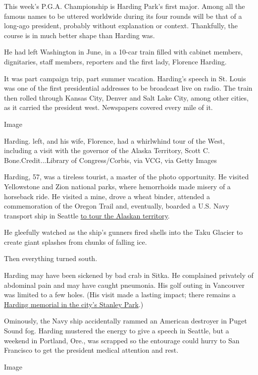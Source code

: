 This week's P.G.A. Championship is Harding Park's first major. Among all
the famous names to be uttered worldwide during its four rounds will be
that of a long-ago president, probably without explanation or context.
Thankfully, the course is in much better shape than Harding was.

He had left Washington in June, in a 10-car train filled with cabinet
members, dignitaries, staff members, reporters and the first lady,
Florence Harding.

It was part campaign trip, part summer vacation. Harding's speech in St.
Louis was one of the first presidential addresses to be broadcast live
on radio. The train then rolled through Kansas City, Denver and Salt
Lake City, among other cities, as it carried the president west.
Newspapers covered every mile of it.

Image

Harding. left, and his wife, Florence, had a whirlwhind tour of the
West, including a visit with the governor of the Alaska Territory, Scott
C. Bone.Credit...Library of Congress/Corbis, via VCG, via Getty Images

Harding, 57, was a tireless tourist, a master of the photo opportunity.
He visited Yellowstone and Zion national parks, where hemorrhoids made
misery of a horseback ride. He visited a mine, drove a wheat binder,
attended a commemoration of the Oregon Trail and, eventually, boarded a
U.S. Navy transport ship in Seattle
\href{http://www.sitnews.us/Kiffer/PresidentialVisitor/081615_harding.html}{to
tour the Alaskan territory}.

He gleefully watched as the ship's gunners fired shells into the Taku
Glacier to create giant splashes from chunks of falling ice.

Then everything turned south.

Harding may have been sickened by bad crab in Sitka. He complained
privately of abdominal pain and may have caught pneumonia. His golf
outing in Vancouver was limited to a few holes. (His visit made a
lasting impact; there remains a
\href{https://www.vancouverhistory.ca/archives_harding.htm}{Harding
memorial in the city's Stanley Park}.)

Ominously, the Navy ship accidentally rammed an American destroyer in
Puget Sound fog. Harding mustered the energy to give a speech in
Seattle, but a weekend in Portland, Ore., was scrapped so the entourage
could hurry to San Francisco to get the president medical attention and
rest.

Image

